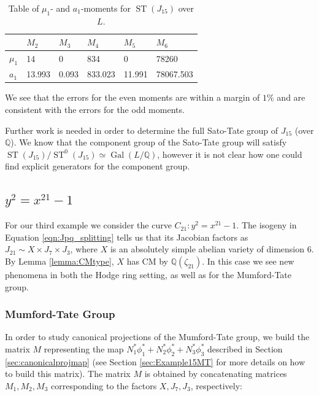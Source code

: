 \documentclass[reqno, oneside, 12pt]{amsart}
\DeclareMathOperator{\ST}{ST}
\DeclareMathOperator{\Gal}{Gal}
\newcommand{\Q}{\mathbb{Q}}
\theoremstyle{remark}
\numberwithin{equation}{section}
\begin{document}
\begin{table}[h]
\begin{tabular}{|l|l|l|l|l|l|}
\hline
& $M_2$ & $M_3$&$M_4$ & $M_5$ & $M_6$\\ 
\hline
$\mu_1$& 14 &  0 & 834 &  0 & 78260\\
$a_1$ & 13.993  &  0.093  &  833.023   &  11.991  &  78067.503\\
\hline
\end{tabular}
\caption{Table of $\mu_1$- and $a_1$-moments for $\ST(J_{15})$ over $L$.}\label{table:momemntsJ15L}\vspace{-.2in}
\end{table}
We see that the errors for the even moments are within a margin of $1\%$ and are consistent with the errors for the odd moments.

Further work is needed in order to determine the full Sato-Tate group of  $J_{15}$ (over $\Q$). We know that the component group of the Sato-Tate group will satisfy $\ST(J_{15})/\ST^0(J_{15}) \simeq \Gal(L/\Q)$, however it is not clear how one could find explicit generators for the component group.











\subsection{$y^2=x^{21}-1$}\label{sec:Example21}

For our third example we consider the curve $C_{21}\colon y^2=x^{21}-1.$ The isogeny in Equation \eqref{eqn:Jpq_splitting} tells us that its Jacobian factors as $J_{21}\sim X\times J_7 \times J_3 $, where $X$ is an absolutely simple abelian variety of dimension 6. By  Lemma \ref{lemma:CMtype},  $X$ has CM by $\Q(\zeta_{21})$. In this case we see new phenomena in both the Hodge ring setting, as well as for the Mumford-Tate group. 


\subsubsection{Mumford-Tate Group}

In order to study canonical projections of the Mumford-Tate group, we build the matrix $M$ representing the map $N_1^* \phi_1^*+N_2^* \phi_2^*+N_3^* \phi_3^*$ described in Section \ref{sec:canonicalprojmap} (see Section \ref{sec:Example15MT} for more details on how to build this matrix). The matrix $M$ is obtained by concatenating matrices $M_1, M_2,M_3$ corresponding to the factors $X, J_7, J_3$, respectively:
\end{document}
